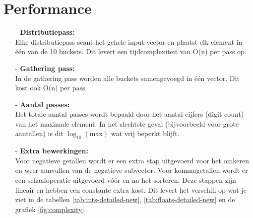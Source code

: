 \documentclass{article}
\begin{document}
\section{Performance}
\begin{itemize}
\item[-] \textbf{Distributiepass:} \\
Elke distributiepass scant het gehele input vector en plaatst elk element in één van de 10 buckets. Dit levert een tijdcomplexiteit van O(n) per pass op.

\item[-] \textbf{Gathering pass:} \\
In de gathering pass worden alle buckets samengevoegd in één vector. Dit kost ook O(n) per pass.

\item[-] \textbf{Aantal passes:} \\
Het totale aantal passes wordt bepaald door het aantal cijfers (digit count) van het maximale element. 
In het slechtste geval (bijvoorbeeld voor grote aantallen) is dit $\log_{10}(\mathrm{max})$ wat vrij beperkt blijft.

\item[-] \textbf{Extra bewerkingen:} \\
Voor negatieve getallen wordt er een extra stap uitgevoerd voor het omkeren en weer aanvullen van de negatieve subvector.
Voor kommagetallen wordt er een schaaloperatie uitgevoerd vóór en na het sorteren. Deze stappen zijn lineair en hebben een constante extra kost. 
Dit levert het verschill op wat je ziet in de tabellen \ref{tab:ints-detailed-new}, \ref{tab:floats-detailed-new} en de grafiek \ref{fig:complexity}.
\end{itemize}

\newpage
\end{document}
